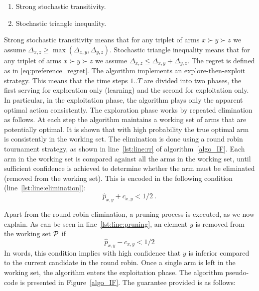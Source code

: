 \documentclass[MSc,beforeExam]{iitcsthesis}
\begin{document}
	\begin{enumerate}

		\item Strong stochastic transitivity.

		\item Stochastic triangle inequality.

	\end{enumerate}
	Strong stochastic transitivity means that for any triplet of arms $x \succ y \succ z$ we assume $\Delta_{x,z} \geq \max(\Delta_{x,y},\Delta_{y,z})$.
	Stochastic triangle inequality means that for any triplet of arms $x \succ y \succ z$ we assume $\Delta_{x,z} \leq \Delta_{x,y} + \Delta_{y,z}$.
	The regret is defined as in \eqref{eq:preference_regret}.
	The algorithm implements an explore-then-exploit strategy.
	This means that the time steps $1..T$ are divided into two phases, the first serving for exploration only (learning) and the second for exploitation only.
	In particular, in the exploitation phase, the algorithm plays only the apparent optimal action consistently.
	The exploration phase works by repeated elimination as follows.
	At each step the algorithm maintains a working set of arms that are potentially optimal.
	It is shown that with high probability the true optimal arm is consistently in the working set.
	The elimination is done using a round robin tournament strategy, as shown in line~\ref{lst:line:rr} of algorithm~\ref{algo_IF}.
	Each arm in the working set is compared against all the arms in the working set, until sufficient confidence is achieved to determine whether the arm must be eliminated (removed from the working set).
This is encoded in the following condition (line~\ref{lst:line:elimination}):
	 $$\hat p_{x,y}+c_{x,y}<1/2\ .$$
	 
	Apart from the round robin elimination, a pruning process is executed, as we now explain.
	As can be seen in line~\ref{lst:line:pruning}, an element $y$ is removed from the working set $\cal P$ if $$\hat p_{x,y}-c_{x,y}<1/2$$ 
	In words, this condition implies with high confidence that $y$ is inferior compared to the current candidate in the round robin.
	Once a single arm is left in the working set, the algorithm enters the exploitation phase.
	The algorithm pseudo-code is presented in Figure~\ref{algo_IF}. 
	The guarantee provided is as follows:
\end{document}
